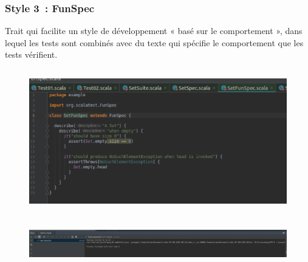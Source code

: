 \documentclass[12pt]{article}
\begin{document}

\par

\subsubsection{Style 3 : FunSpec}

\begin{justify}
Trait qui facilite un style de développement « basé sur le comportement », dans lequel les tests sont combinés avec du texte qui spécifie le comportement que les tests vérifient.
\end{justify}\par




\begin{figure}[H]
	\begin{Center}
		\includegraphics[width=5.06in,height=2.46in]{./media/image30.png}
	\end{Center}
\end{figure}



\par




\begin{figure}[H]
	\begin{Center}
		\includegraphics[width=6.3in,height=0.66in]{./media/image31.png}
	\end{Center}
\end{figure}
\end{document}

